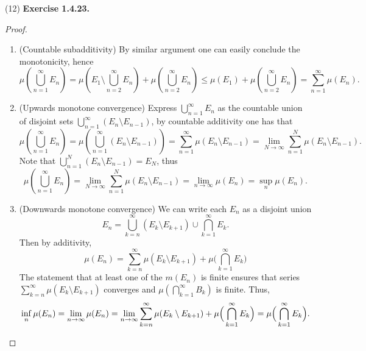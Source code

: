 \documentclass[a4paper]{article}
\begin{document}
(12) {\bfseries Exercise 1.4.23.}\begin{proof}\ 
\begin{enumerate}[label = (\roman*)]
    \item (Countable subadditivity) By similar argument one can easily conclude the monotonicity, hence $$
    \mu(\bigcup_{n = 1}^\infty E_n) = \mu(E_1 \setminus \bigcup_{n = 2}^\infty E_n)
    + \mu(\bigcup_{n = 2}^\infty E_n) \leq \mu(E_1) + \mu(\bigcup_{n = 2}^\infty E_n) = \sum_{n = 1}^\infty \mu(E_n).
    $$
    \item (Upwards monotone convergence) Express $\bigcup_{n = 1}^\infty E_n$ as the countable union of disjoint sets 
    $\bigcup_{n = 1}^\infty (E_n \setminus E_{n - 1})$, by countable additivity one has that $$
    \mu\left( \bigcup_{n = 1}^\infty E_n \right) = \mu\left( \bigcup_{n = 1}^\infty (E_n \setminus E_{n - 1}) \right)
    = \sum_{n = 1}^\infty \mu(E_n \setminus E_{n - 1}) = \lim_{N \to \infty} \sum_{n = 1}^N \mu(E_n \setminus E_{n - 1}).
    $$Note that $\bigcup_{n = 1}^N (E_n \setminus E_{n - 1}) = E_N$, thus $$
    \mu\left( \bigcup_{n = 1}^\infty E_n \right) = \lim_{N \to \infty} \sum_{n = 1}^N \mu(E_n \setminus E_{n - 1})
    = \lim_{n \to \infty} \mu(E_n) = \sup_n \mu(E_n).
    $$
    \item (Downwards monotone convergence) We can write each $E_n$ as a disjoint union $$
    E_n = \bigcup_{k = n}^\infty (E_k \setminus E_{k + 1}) \cup \bigcap_{k = 1}^\infty E_k.
    $$Then by additivity,$$
    \mu(E_n) = \sum_{k = n}^\infty \mu(E_k \setminus E_{k + 1}) + \mu\Big(\bigcap_{k = 1}^\infty E_k \Big)
    $$The statement that at least one of the $m(E_n)$ is finite ensures that series $\sum_{k = n}^\infty \mu(E_k \setminus E_{k + 1})$ converges
    and $\mu(\bigcap_{k = 1}^\infty B_k)$ is finite. Thus,\[
    \inf_n \mu(E_n) = \lim_{n \to \infty} \mu(E_n) = \lim_{n \to \infty} \sum_{k = n}^\infty \mu(E_k \setminus E_{k + 1}) + 
    \mu\Big(\bigcap_{k = 1}^\infty E_k \Big) = \mu\Big(\bigcap_{k = 1}^\infty E_k \Big).\qedhere
    \]
\end{enumerate}
\end{proof}
\end{document}
